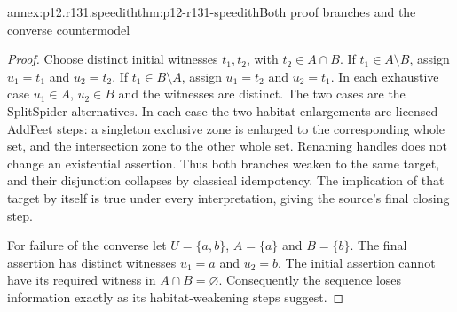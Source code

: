 \begin{annexitem}{annex:p12.r131.speedith}{thm:p12-r131-speedith}{Both proof branches and the converse countermodel}
\begin{proof}
Choose distinct initial witnesses $t_1,t_2$, with $t_2\in A\cap B$.
If $t_1\in A\setminus B$, assign $u_1=t_1$ and $u_2=t_2$.
If $t_1\in B\setminus A$, assign $u_1=t_2$ and $u_2=t_1$.
In each exhaustive case $u_1\in A$, $u_2\in B$ and the witnesses
are distinct. The two cases are the SplitSpider alternatives. In
each case the two habitat enlargements are licensed AddFeet steps:
a singleton exclusive zone is enlarged to the corresponding whole
set, and the intersection zone to the other whole set. Renaming
handles does not change an existential assertion. Thus both branches
weaken to the same target, and their disjunction collapses by classical
idempotency. The implication of that target by itself is true under
every interpretation, giving the source's final closing step.

For failure of the converse let $U=\{a,b\}$, $A=\{a\}$ and
$B=\{b\}$. The final assertion has distinct witnesses $u_1=a$
and $u_2=b$. The initial assertion cannot have its required witness
in $A\cap B=\varnothing$. Consequently the sequence loses
information exactly as its habitat-weakening steps suggest.
\end{proof}
\end{annexitem}
